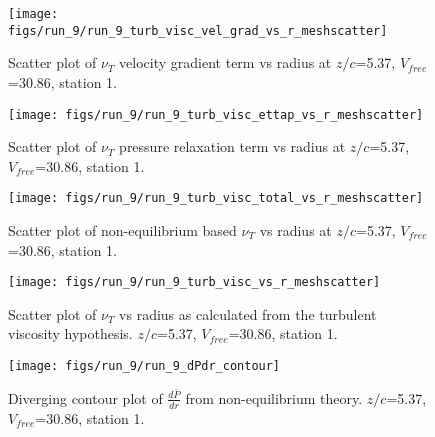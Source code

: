 \begin{figure}[H]
\centering
\texttt{[image: figs/run\_9/run\_9\_turb\_visc\_vel\_grad\_vs\_r\_meshscatter]}
\caption{Scatter plot of $\nu_T$ velocity gradient term vs radius at $z/c$=5.37, $V_{free}$=30.86, station 1.}
\end{figure}


\begin{figure}[H]
\centering
\texttt{[image: figs/run\_9/run\_9\_turb\_visc\_ettap\_vs\_r\_meshscatter]}
\caption{Scatter plot of $\nu_T$ pressure relaxation term vs radius at $z/c$=5.37, $V_{free}$=30.86, station 1.}
\end{figure}


\begin{figure}[H]
\centering
\texttt{[image: figs/run\_9/run\_9\_turb\_visc\_total\_vs\_r\_meshscatter]}
\caption{Scatter plot of non-equilibrium based $\nu_T$ vs radius at $z/c$=5.37, $V_{free}$=30.86, station 1.}
\end{figure}


\begin{figure}[H]
\centering
\texttt{[image: figs/run\_9/run\_9\_turb\_visc\_vs\_r\_meshscatter]}
\caption{Scatter plot of $\nu_T$ vs radius as calculated from the turbulent viscosity hypothesis. $z/c$=5.37, $V_{free}$=30.86, station 1.}
\end{figure}


\begin{figure}[H]
\centering
\texttt{[image: figs/run\_9/run\_9\_dPdr\_contour]}
\caption{Diverging contour plot of $\frac{d\bar{P}}{dr}$ from non-equilibrium theory. $z/c$=5.37, $V_{free}$=30.86, station 1.}
\end{figure}


